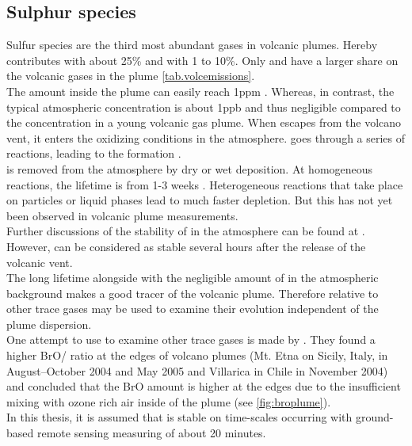 \documentclass  [
  paper    = a4,
  BCOR     = 10mm,
  twoside,
  fontsize = 12pt,
  fleqn,
  toc      = bibnumbered,
  toc      = listofnumbered,
  numbers  = noendperiod,
  headings = normal,
  listof   = leveldown,
  version  = 3.03
]                                       {scrreprt}
\begin{document}
\subsection{Sulphur species\label{chap:so2}}
Sulfur species are the third most abundant gases in volcanic plumes. Hereby  contributes with about 25\% and  with 1 to 10\%. Only  and  have a larger share on the volcanic gases in the plume \cref{tab.volcemissions}.\\
The   amount inside the plume can easily reach 1ppm \citep{oppenheimer2003volcanic}. Whereas, in contrast, the typical atmospheric concentration is about 1ppb and thus negligible compared to the concentration in a young volcanic gas plume.
When  escapes from the volcano vent, it enters the oxidizing conditions in the atmosphere.  goes through a series of reactions, leading to the  formation \citep{seinfeld2016atmospheric}.\\
 is removed from the atmosphere by dry or wet
deposition. At homogeneous reactions, the lifetime is from 1-3 weeks \citep{robock2000volcanic}. Heterogeneous reactions that take place on particles or liquid phases lead to much faster depletion. But this has not yet been observed in volcanic plume measurements.\\
Further discussions of the stability of   in the atmosphere can be found at \citet{lubcke2014optical}.\\
However,  can be considered as stable several hours after the release of the volcanic vent.\\ The long lifetime alongside with the negligible amount of  in the atmospheric background makes  a good tracer of the volcanic plume.
Therefore relative to other trace gases  may be used to examine their evolution independent of the plume dispersion.\\
One attempt to use  to examine other trace gases is made by \citet{bobrowski2007reactive}. They found a higher BrO/ ratio at the edges of volcano plumes (Mt. Etna on Sicily, Italy, in August–October 2004 and May 2005 and Villarica in Chile in November 2004) and concluded that the BrO amount is higher at the edges due to the insufficient mixing with ozone rich air inside of the plume (see \cref{fig:broplume}).\\
In this thesis, it is assumed that   is stable on time-scales occurring with ground-based remote sensing measuring of about 20 minutes.
%
\end{document}
